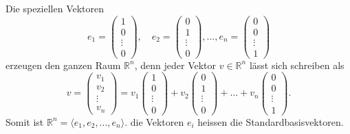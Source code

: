 \begin{beispiel}
Die speziellen Vektoren
\[
e_1=\begin{pmatrix}1\\0\\\vdots\\0\end{pmatrix},\quad
e_2=\begin{pmatrix}0\\1\\\vdots\\0\end{pmatrix},
\dots,
e_n=\begin{pmatrix}0\\0\\\vdots\\1\end{pmatrix}
\]
erzeugen den ganzen Raum $\mathbb R^n$, denn jeder Vektor $v\in\mathbb R^n$
lässt sich schreiben als
\[
v=\begin{pmatrix}v_1\\v_2\\\vdots\\v_n\end{pmatrix}
=
v_1\begin{pmatrix}1\\0\\\vdots\\0\end{pmatrix}+
v_2\begin{pmatrix}0\\1\\\vdots\\0\end{pmatrix}+
\dots+
v_n\begin{pmatrix}0\\0\\\vdots\\1\end{pmatrix}.
\]
Somit ist $\mathbb R^n=\langle e_1,e_2,\dots,e_n\rangle$.
die Vektoren $e_i$ heissen die Standardbasisvektoren.
\end{beispiel}


